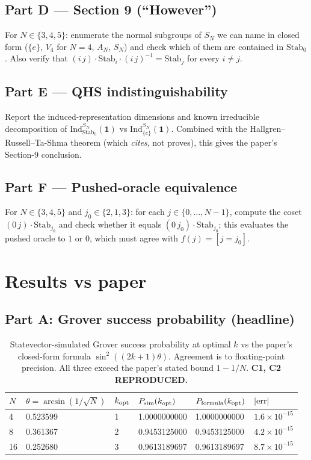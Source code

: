 \documentclass[11pt]{article}
\begin{document}
\subsection{Part D --- Section 9 (``However'')}
For $N\in\{3,4,5\}$: enumerate the normal subgroups of $S_N$ we can name
in closed form ($\{e\}$, $V_4$ for $N=4$, $A_N$, $S_N$) and check which of
them are contained in $\mathrm{Stab}_0$.  Also verify that
$(i\,j)\cdot\mathrm{Stab}_i\cdot(i\,j)^{-1}=\mathrm{Stab}_j$ for every
$i\neq j$.

\subsection{Part E --- QHS indistinguishability}
Report the induced-representation dimensions and known irreducible
decomposition of $\mathrm{Ind}_{\mathrm{Stab}_0}^{S_N}(\mathbf 1)$ vs
$\mathrm{Ind}_{\{e\}}^{S_N}(\mathbf 1)$.  Combined with the
Hallgren--Russell--Ta-Shma theorem (which \emph{cites}, not proves), this
gives the paper's Section-9 conclusion.

\subsection{Part F --- Pushed-oracle equivalence}
For $N\in\{3,4,5\}$ and $j_0\in\{2,1,3\}$: for each
$j\in\{0,\dots,N-1\}$, compute the coset
$(0\,j)\cdot\mathrm{Stab}_{j_0}$ and check whether it equals
$(0\,j_0)\cdot\mathrm{Stab}_{j_0}$; this evaluates the pushed oracle to
$1$ or $0$, which must agree with $f(j)=[j=j_0]$.

\section{Results vs paper}

\subsection{Part A: Grover success probability (headline)}

\begin{table}[h!]
\centering
\begin{tabular}{@{}llllll@{}}
\toprule
$N$ & $\theta=\arcsin(1/\sqrt N)$ & $k_{\rm opt}$ & $P_{\rm sim}(k_{\rm opt})$ & $P_{\rm formula}(k_{\rm opt})$ & $|{\rm err}|$ \\
\midrule
4  & 0.523599 & 1 & 1.0000000000 & 1.0000000000 & $1.6\times10^{-15}$ \\
8  & 0.361367 & 2 & 0.9453125000 & 0.9453125000 & $4.2\times10^{-15}$ \\
16 & 0.252680 & 3 & 0.9613189697 & 0.9613189697 & $8.7\times10^{-15}$ \\
\bottomrule
\end{tabular}
\caption{Statevector-simulated Grover success probability at optimal $k$
vs the paper's closed-form formula $\sin^{2}((2k{+}1)\theta)$.  Agreement
is to floating-point precision.  All three exceed the paper's stated bound
$1-1/N$.  \textbf{C1, C2 REPRODUCED.}}
\end{table}
\end{document}

